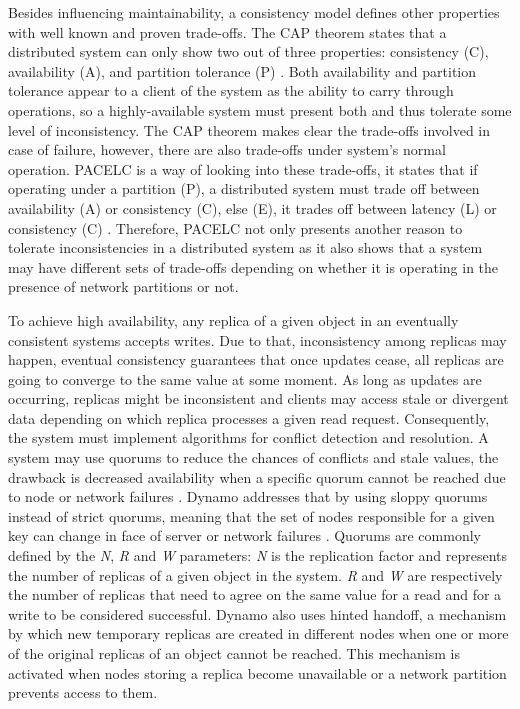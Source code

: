 \documentclass[man,floatsintext,12pt]{apa6}
\begin{document}
Besides influencing maintainability, a consistency model defines other
properties with well known and proven trade-offs. The CAP theorem states that a
distributed system can only show two out of three properties: consistency (C),
availability (A), and partition tolerance (P) \parencite{Brewer2000,Gilbert2002}.
Both availability and partition tolerance appear to a client of the system as
the ability to carry through operations, so a highly-available system must
present both and thus tolerate some level of inconsistency. The CAP theorem
makes clear the trade-offs involved in case of failure, however, there are also
trade-offs under system's normal operation. PACELC is a way of looking into
these trade-offs, it states that if operating under a partition (P), a
distributed system must trade off between availability (A) or consistency (C),
else (E), it trades off between latency (L) or consistency (C)
\parencite{Abadi2012}. Therefore, PACELC not only presents another reason to
tolerate inconsistencies in a distributed system as it also shows that a system
may have different sets of trade-offs depending on whether it is operating in
the presence of network partitions or not.

To achieve high availability, any replica of a given object in an eventually
consistent systems accepts writes. Due to that, inconsistency among replicas
may happen, eventual consistency guarantees that once updates cease, all
replicas are going to converge to the same value at some moment. As long as
updates are occurring, replicas might be inconsistent and clients may access
stale or divergent data depending on which replica processes a given read
request. Consequently, the system must implement algorithms for conflict
detection and resolution. A system may use quorums to reduce the chances of
conflicts and stale values, the drawback is decreased availability when a
specific quorum cannot be reached due to node or network failures
\parencite{Vogels2009}. Dynamo addresses that by using sloppy quorums instead of
strict quorums, meaning that the set of nodes responsible for a given key can
change in face of server or network failures \parencite{DeCandia2007}. Quorums are
commonly defined by the \textit{N}, \textit{R} and \textit{W} parameters:
\textit{N} is the replication factor and represents the number of replicas of a
given object in the system. \textit{R} and \textit{W} are respectively the
number of replicas that need to agree on the same value for a read and for a
write to be considered successful. Dynamo also uses hinted handoff, a mechanism
by which new temporary replicas are created in different nodes when one or
more of the original replicas of an object cannot be reached. This mechanism is
activated when nodes storing a replica become unavailable or a network partition
prevents access to them.
\end{document}

